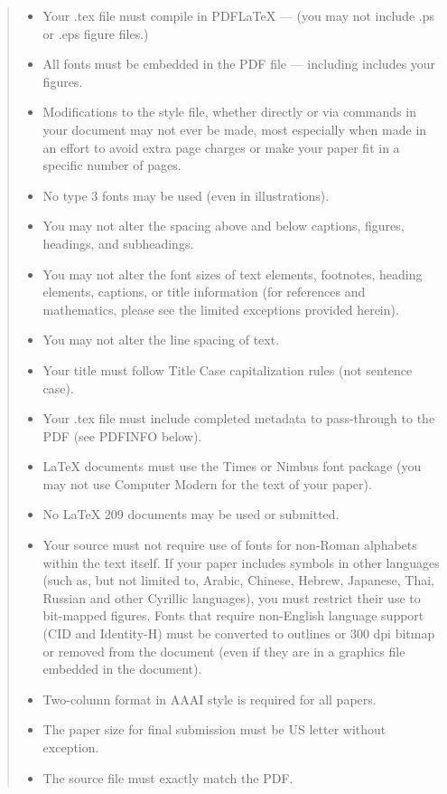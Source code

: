 \documentclass[letterpaper]{article} %
\begin{document}
\begin{quote}
\begin{itemize}
\item Your .tex file must compile in PDF\LaTeX{} --- (you may not include .ps or .eps figure files.)
\item All fonts must be embedded in the PDF file --- including includes your figures.
\item Modifications to the style file, whether directly or via commands in your document may not ever be made, most especially when made in an effort to avoid extra page charges or make your paper fit in a specific number of pages.
\item No type 3 fonts may be used (even in illustrations).
\item You may not alter the spacing above and below captions, figures, headings, and subheadings.
\item You may not alter the font sizes of text elements, footnotes, heading elements, captions, or title information (for references and mathematics, please see the limited exceptions provided herein).
\item You may not alter the line spacing of text.
\item Your title must follow Title Case capitalization rules (not sentence case).
\item Your .tex file must include completed metadata to pass-through to the PDF (see PDFINFO below).
\item \LaTeX{} documents must use the Times or Nimbus font package (you may not use Computer Modern for the text of your paper).
\item No \LaTeX{} 209 documents may be used or submitted.
\item Your source must not require use of fonts for non-Roman alphabets within the text itself. If your paper includes symbols in other languages (such as, but not limited to, Arabic, Chinese, Hebrew, Japanese, Thai, Russian and other Cyrillic languages), you must restrict their use to bit-mapped figures. Fonts that require non-English language support (CID and Identity-H) must be converted to outlines or 300 dpi bitmap or removed from the document (even if they are in a graphics file embedded in the document).
\item Two-column format in AAAI style is required for all papers.
\item The paper size for final submission must be US letter without exception.
\item The source file must exactly match the PDF.

\end{itemize}
\end{quote}
\end{document}
